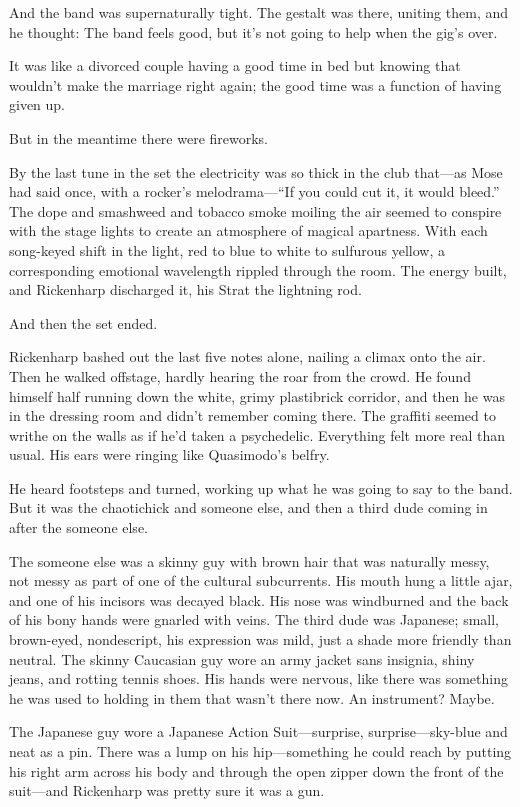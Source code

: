 And the band was supernaturally tight. The gestalt was there, uniting them, and he thought: The band feels good, but it's not going to help when the gig's over.

It was like a divorced couple having a good time in bed but knowing that wouldn't make the marriage right again; the good time was a function of having given up.

But in the meantime there were fireworks.

By the last tune in the set the electricity was so thick in the club that—as Mose had said once, with a rocker's melodrama—``If you could cut it, it would bleed.'' The dope and smashweed and tobacco smoke moiling the air seemed to conspire with the stage lights to create an atmosphere of magical apartness. With each song-keyed shift in the light, red to blue to white to sulfurous yellow, a corresponding emotional wavelength rippled through the room. The energy built, and Rickenharp discharged it, his Strat the lightning rod.

And then the set ended.

Rickenharp bashed out the last five notes alone, nailing a climax onto the air. Then he walked offstage, hardly hearing the roar from the crowd. He found himself half running down the white, grimy plastibrick corridor, and then he was in the dressing room and didn't remember coming there. The graffiti seemed to writhe on the walls as if he'd taken a psychedelic. Everything felt more real than usual. His ears were ringing like Quasimodo's belfry.

He heard footsteps and turned, working up what he was going to say to the band. But it was the chaotichick and someone else, and then a third dude coming in after the someone else.

The someone else was a skinny guy with brown hair that was naturally messy, not messy as part of one of the cultural subcurrents. His mouth hung a little ajar, and one of his incisors was decayed black. His nose was windburned and the back of his bony hands were gnarled with veins. The third dude was Japanese; small, brown-eyed, nondescript, his expression was mild, just a shade more friendly than neutral. The skinny Caucasian guy wore an army jacket sans insignia, shiny jeans, and rotting tennis shoes. His hands were nervous, like there was something he was used to holding in them that wasn't there now. An instrument? Maybe.

The Japanese guy wore a Japanese Action Suit—surprise, surprise—sky-blue and neat as a pin. There was a lump on his hip—something he could reach by putting his right arm across his body and through the open zipper down the front of the suit—and Rickenharp was pretty sure it was a gun.

